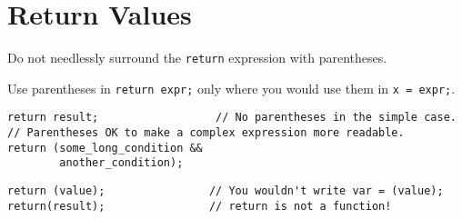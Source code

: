 
\section{Return Values}\label{sec:return-values}
Do not needlessly surround the \texttt{return} expression with parentheses.

Use parentheses in \texttt{return expr;} only where you would use them in \texttt{x = expr;}.
\begin{verbatim}
return result;                  // No parentheses in the simple case.
// Parentheses OK to make a complex expression more readable.
return (some_long_condition &&
        another_condition);
\end{verbatim}

\begin{verbatim}
return (value);                // You wouldn't write var = (value);
return(result);                // return is not a function!
\end{verbatim}
